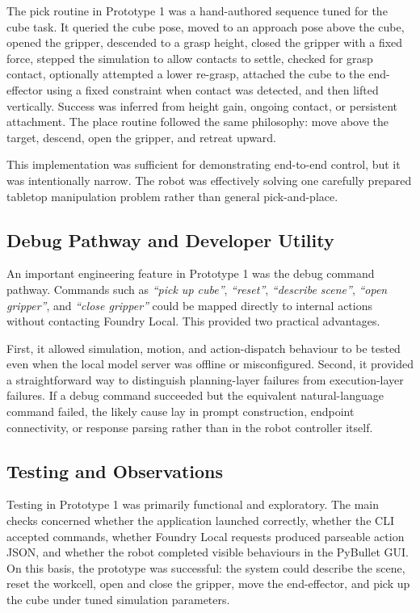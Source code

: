 \documentclass[12pt,a4paper]{article}
\begin{document}
The pick routine in Prototype 1 was a hand-authored sequence tuned for the cube task. It queried the cube pose, moved to an approach pose above the cube, opened the gripper, descended to a grasp height, closed the gripper with a fixed force, stepped the simulation to allow contacts to settle, checked for grasp contact, optionally attempted a lower re-grasp, attached the cube to the end-effector using a fixed constraint when contact was detected, and then lifted vertically. Success was inferred from height gain, ongoing contact, or persistent attachment. The place routine followed the same philosophy: move above the target, descend, open the gripper, and retreat upward.

This implementation was sufficient for demonstrating end-to-end control, but it was intentionally narrow. The robot was effectively solving one carefully prepared tabletop manipulation problem rather than general pick-and-place.

\subsection{Debug Pathway and Developer Utility}

An important engineering feature in Prototype 1 was the debug command pathway. Commands such as \textit{``pick up cube''}, \textit{``reset''}, \textit{``describe scene''}, \textit{``open gripper''}, and \textit{``close gripper''} could be mapped directly to internal actions without contacting Foundry Local. This provided two practical advantages.

First, it allowed simulation, motion, and action-dispatch behaviour to be tested even when the local model server was offline or misconfigured. Second, it provided a straightforward way to distinguish planning-layer failures from execution-layer failures. If a debug command succeeded but the equivalent natural-language command failed, the likely cause lay in prompt construction, endpoint connectivity, or response parsing rather than in the robot controller itself.

\subsection{Testing and Observations}

Testing in Prototype 1 was primarily functional and exploratory. The main checks concerned whether the application launched correctly, whether the CLI accepted commands, whether Foundry Local requests produced parseable action JSON, and whether the robot completed visible behaviours in the PyBullet GUI. On this basis, the prototype was successful: the system could describe the scene, reset the workcell, open and close the gripper, move the end-effector, and pick up the cube under tuned simulation parameters.
\end{document}
